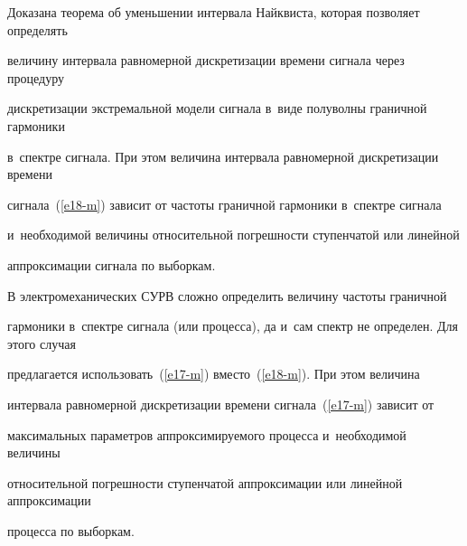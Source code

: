   


  Доказана теорема об уменьшении интервала Найквиста, которая позволяет определять 


величину интервала равномерной дискретизации времени сигнала через процедуру 


дискретизации экстремальной модели сигнала в~виде полуволны граничной гармоники 


в~спектре сигнала. При этом величина интервала равномерной дискретизации времени 


сигнала~(\ref{e18-m}) зависит от частоты граничной гармоники в~спектре сигнала 


и~необходимой величины относительной погрешности ступенчатой или линейной 


аппроксимации сигнала по выборкам.


  


  В электромеханических СУРВ сложно определить величину частоты граничной 


гармоники в~спектре сигнала (или процесса), да и~сам спектр не определен. Для этого случая 


предлагается использовать~(\ref{e17-m}) вместо~(\ref{e18-m}). При этом величина 


интервала равномерной дискретизации времени сигнала~(\ref{e17-m}) зависит от 


максимальных параметров аппроксимируемого процесса и~необходимой величины 


относительной погрешности ступенчатой аппроксимации или линейной аппроксимации 


процесса по выборкам.


  





